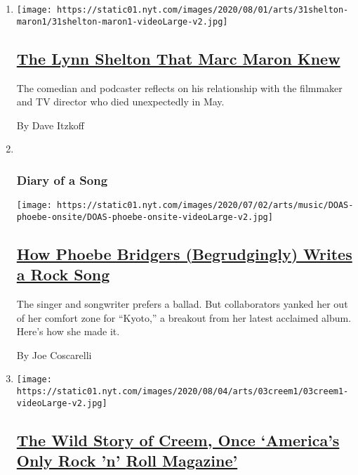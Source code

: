 \begin{enumerate}
\def\labelenumi{\arabic{enumi}.}
\item
  \texttt{[image: https://static01.nyt.com/images/2020/08/01/arts/31shelton-maron1/31shelton-maron1-videoLarge-v2.jpg]}

  \hypertarget{the-lynn-shelton-that-marc-maron-knew}{%
  \subsection{\texorpdfstring{\href{/2020/07/31/movies/marc-maron-lynn-shelton.html}{The
  Lynn Shelton That Marc Maron
  Knew}}{The Lynn Shelton That Marc Maron Knew}}\label{the-lynn-shelton-that-marc-maron-knew}}

  The comedian and podcaster reflects on his relationship with the
  filmmaker and TV director who died unexpectedly in May.

  By Dave Itzkoff
\item ~
  \hypertarget{diary-of-a-song}{%
  \subsubsection{Diary of a Song}\label{diary-of-a-song}}

  \texttt{[image: https://static01.nyt.com/images/2020/07/02/arts/music/DOAS-phoebe-onsite/DOAS-phoebe-onsite-videoLarge-v2.jpg]}

  \hypertarget{how-phoebe-bridgers-begrudgingly-writes-a-rock-song}{%
  \subsection{\texorpdfstring{\href{/2020/07/30/arts/music/phoebe-bridgers-kyoto.html}{How
  Phoebe Bridgers (Begrudgingly) Writes a Rock
  Song}}{How Phoebe Bridgers (Begrudgingly) Writes a Rock Song}}\label{how-phoebe-bridgers-begrudgingly-writes-a-rock-song}}

  The singer and songwriter prefers a ballad. But collaborators yanked
  her out of her comfort zone for ``Kyoto,'' a breakout from her latest
  acclaimed album. Here's how she made it.

  By Joe Coscarelli
\item
  \texttt{[image: https://static01.nyt.com/images/2020/08/04/arts/03creem1/03creem1-videoLarge-v2.jpg]}

  \hypertarget{the-wild-story-of-creem-once-americas-only-rock-n-roll-magazine}{%
  \subsection{\texorpdfstring{\href{/2020/08/03/arts/music/creem-magazine-documentary.html}{The
  Wild Story of Creem, Once `America's Only Rock 'n' Roll
  Magazine'}}{The Wild Story of Creem, Once `America's Only Rock 'n' Roll Magazine'}}\label{the-wild-story-of-creem-once-americas-only-rock-n-roll-magazine}}


\end{enumerate}
